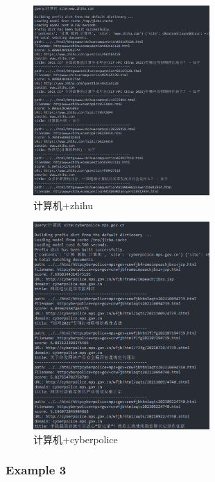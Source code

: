 \documentclass[12pt,a4paper]{article}
\begin{document}
\begin{figure}[H]
	\includegraphics[width=0.6\textwidth]{q10.png}
	\centering
	 \caption{计算机+zhihu}
\end{figure}
\begin{figure}[H]
	\includegraphics[width=0.6\textwidth]{q11.png}
	\centering
	 \caption{计算机+cyberpolice}
\end{figure}
\subsubsection{Example 3}
\end{document}
